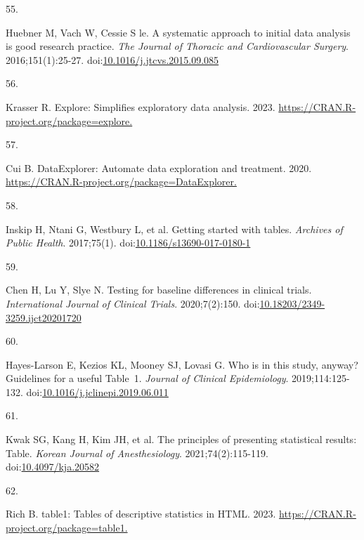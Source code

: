 \documentclass[
]{book}
\newlength{\cslhangindent}
\newlength{\csllabelwidth}
\newlength{\cslentryspacingunit} %
\newenvironment{CSLReferences}[2] %
 {%
  \setlength{\parindent}{0pt}
  \ifodd #1
  \let\oldpar\par
  \def\par{\hangindent=\cslhangindent\oldpar}
  \fi
  \setlength{\parskip}{#2\cslentryspacingunit}
 }%
 {}
\newcommand{\CSLLeftMargin}[1]{\parbox[t]{\csllabelwidth}{#1}}
\newcommand{\CSLRightInline}[1]{\parbox[t]{\linewidth - \csllabelwidth}{#1}\break}
\begin{document}
\begin{CSLReferences}{0}{0}
\leavevmode{}%
\CSLLeftMargin{55. }%
\CSLRightInline{Huebner M, Vach W, Cessie S le. A systematic approach to initial data analysis is good research practice. \emph{The Journal of Thoracic and Cardiovascular Surgery}. 2016;151(1):25-27. doi:\href{https://doi.org/10.1016/j.jtcvs.2015.09.085}{10.1016/j.jtcvs.2015.09.085}}

\leavevmode{}%
\CSLLeftMargin{56. }%
\CSLRightInline{Krasser R. Explore: Simplifies exploratory data analysis. 2023. \href{https://CRAN.R-project.org/package=explore}{https://CRAN.R-project.org/package=explore.}}

\leavevmode{}%
\CSLLeftMargin{57. }%
\CSLRightInline{Cui B. DataExplorer: Automate data exploration and treatment. 2020. \href{https://CRAN.R-project.org/package=DataExplorer}{https://CRAN.R-project.org/package=DataExplorer.}}

\leavevmode{}%
\CSLLeftMargin{58. }%
\CSLRightInline{Inskip H, Ntani G, Westbury L, et al. Getting started with tables. \emph{Archives of Public Health}. 2017;75(1). doi:\href{https://doi.org/10.1186/s13690-017-0180-1}{10.1186/s13690-017-0180-1}}

\leavevmode{}%
\CSLLeftMargin{59. }%
\CSLRightInline{Chen H, Lu Y, Slye N. Testing for baseline differences in clinical trials. \emph{International Journal of Clinical Trials}. 2020;7(2):150. doi:\href{https://doi.org/10.18203/2349-3259.ijct20201720}{10.18203/2349-3259.ijct20201720}}

\leavevmode{}%
\CSLLeftMargin{60. }%
\CSLRightInline{Hayes-Larson E, Kezios KL, Mooney SJ, Lovasi G. Who is in this study, anyway? Guidelines for a useful Table~1. \emph{Journal of Clinical Epidemiology}. 2019;114:125-132. doi:\href{https://doi.org/10.1016/j.jclinepi.2019.06.011}{10.1016/j.jclinepi.2019.06.011}}

\leavevmode{}%
\CSLLeftMargin{61. }%
\CSLRightInline{Kwak SG, Kang H, Kim JH, et al. The principles of presenting statistical results: Table. \emph{Korean Journal of Anesthesiology}. 2021;74(2):115-119. doi:\href{https://doi.org/10.4097/kja.20582}{10.4097/kja.20582}}

\leavevmode{}%
\CSLLeftMargin{62. }%
\CSLRightInline{Rich B. table1: Tables of descriptive statistics in HTML. 2023. \href{https://CRAN.R-project.org/package=table1}{https://CRAN.R-project.org/package=table1.}}


\end{CSLReferences}
\end{document}
